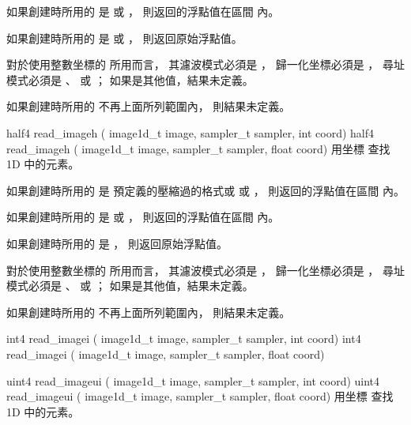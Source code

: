 如果創建時所用的  是
  或 ，
則返回的浮點值在區間 \math{[-1.0 \cdots 1.0]} 內。

如果創建時所用的  是
  或 ，
則返回原始浮點值。

對於使用整數坐標的  所用而言，
其濾波模式必須是 ，
歸一化坐標必須是 ，
尋址模式必須是 、 
 或 ；
如果是其他值，結果未定義。

如果創建時所用的  不再上面所列範圍內，
則結果未定義。
\stopbuffer

half4 read_imageh (
	image1d_t image,
	sampler_t sampler,
	int coord)
half4 read_imageh (
	image1d_t image,
	sampler_t sampler,
	float coord)
\stopbuffer
{}
用坐標  查找 1D   中的元素。

如果創建時所用的  是
預定義的壓縮過的格式或  或 ，
則返回的浮點值在區間 \math{[0.0 \cdots 1.0]} 內。

如果創建時所用的  是
  或 ，
則返回的浮點值在區間 \math{[-1.0 \cdots 1.0]} 內。

如果創建時所用的  是 ，
則返回原始浮點值。

對於使用整數坐標的  所用而言，
其濾波模式必須是 ，
歸一化坐標必須是 ，
尋址模式必須是 、 
 或 ；
如果是其他值，結果未定義。

如果創建時所用的  不再上面所列範圍內，
則結果未定義。
\stopbuffer

int4 read_imagei (
	image1d_t image,
	sampler_t sampler,
	int coord)
int4 read_imagei (
	image1d_t image,
	sampler_t sampler,
	float coord)

uint4 read_imageui (
	image1d_t image,
	sampler_t sampler,
	int coord)
uint4 read_imageui (
	image1d_t image,
	sampler_t sampler,
	float coord)
\stopbuffer
{}
用坐標  查找 1D   中的元素。

